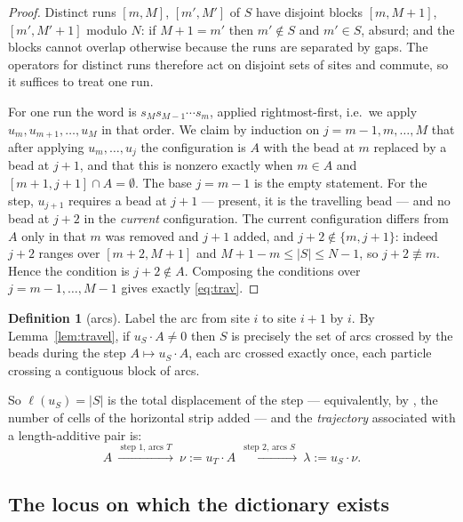 \documentclass[11pt]{article}
\theoremstyle{plain}
\theoremstyle{definition}
\newtheorem{defn}[thm]{Definition}
\begin{document}
\begin{proof}
Distinct runs $[m,M]$, $[m',M']$ of $S$ have disjoint blocks $[m,M+1]$, $[m',M'+1]$ modulo $N$:
if $M+1=m'$ then $m'\notin S$ and $m'\in S$, absurd; and the blocks cannot overlap otherwise
because the runs are separated by gaps. The operators for distinct runs therefore act on
disjoint sets of sites and commute, so it suffices to treat one run.

For one run the word is $s_Ms_{M-1}\cdots s_m$, applied rightmost-first, i.e.\ we apply
$u_m,u_{m+1},\dots,u_M$ in that order. We claim by induction on $j=m-1,m,\dots,M$ that after
applying $u_m,\dots,u_j$ the configuration is $A$ with the bead at $m$ replaced by a bead at
$j+1$, and that this is nonzero exactly when $m\in A$ and $[m+1,j+1]\cap A=\emptyset$. The base
$j=m-1$ is the empty statement. For the step, $u_{j+1}$ requires a bead at $j+1$ --- present,
it is the travelling bead --- and no bead at $j+2$ in the \emph{current} configuration. The
current configuration differs from $A$ only in that $m$ was removed and $j+1$ added, and
$j+2\notin\{m,j+1\}$: indeed $j+2$ ranges over $[m+2,M+1]$ and $M+1-m\le|S|\le N-1$, so
$j+2\not\equiv m$. Hence the condition is $j+2\notin A$. Composing the conditions over
$j=m-1,\dots,M-1$ gives exactly \eqref{eq:trav}.
\end{proof}

\begin{defn}[arcs]\label{def:arcs}
Label the arc from site $i$ to site $i+1$ by $i$. By Lemma~\ref{lem:travel}, if $u_S\cdot A\ne0$
then $S$ is precisely the set of arcs crossed by the beads during the step $A\mapsto u_S\cdot A$,
each arc crossed exactly once, each particle crossing a contiguous block of arcs.
\end{defn}

So $\ell(u_S)=|S|$ is the total displacement of the step --- equivalently, by
\cite[\S2]{ClioCyl}, the number of cells of the horizontal strip added --- and the
\emph{trajectory} associated with a length-additive pair is:
\begin{equation}\label{eq:traj}
  A\ \xrightarrow{\ \text{step 1, arcs }T\ }\ \nu:=u_T\cdot A
     \ \xrightarrow{\ \text{step 2, arcs }S\ }\ \lambda:=u_S\cdot\nu .
\end{equation}

\subsection{The locus on which the dictionary exists}\label{sec:locus}
\end{document}
